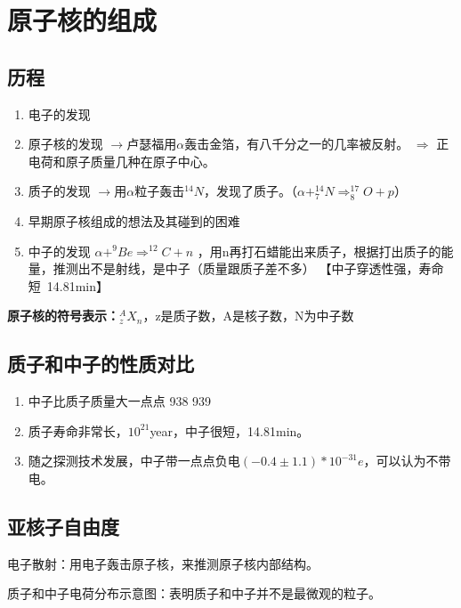 \chapter{原子核的组成}

\section{历程} 

\begin{enumerate}
    \item 电子的发现 
    \item 原子核的发现 $\rightarrow$卢瑟福用$\alpha$轰击金箔，有八千分之一的几率被反射。 $\Rightarrow$ 正电荷和原子质量几种在原子中心。
    \item 质子的发现 $\rightarrow$用$\alpha$粒子轰击$^{14}N$，发现了质子。（$\alpha +  ^{14}_{7}N \Rightarrow  ^{17}_{8}O + p$）
    \item 早期原子核组成的想法及其碰到的困难
    \item 中子的发现 $\alpha + ^{9}Be \Rightarrow ^{12}C + n$  ，用n再打石蜡能出来质子，根据打出质子的能量，推测出不是射线，是中子（质量跟质子差不多）  【中子穿透性强，寿命短~14.81min】
\end{enumerate}

\vspace{1.2em}

\textbf{原子核的符号表示：}$_{z}^{A}X_{n}$，z是质子数，A是核子数，N为中子数

\section{质子和中子的性质对比} 

\begin{enumerate}
    \item 中子比质子质量大一点点  938  939
    \item 质子寿命非常长，$10^21$year，中子很短，14.81min。
    \item 随之探测技术发展，中子带一点点负电$(-0.4\pm 1.1)*10^{-31}e$，可以认为不带电。
\end{enumerate}

\section{亚核子自由度}

电子散射：用电子轰击原子核，来推测原子核内部结构。

质子和中子电荷分布示意图：表明质子和中子并不是最微观的粒子。

